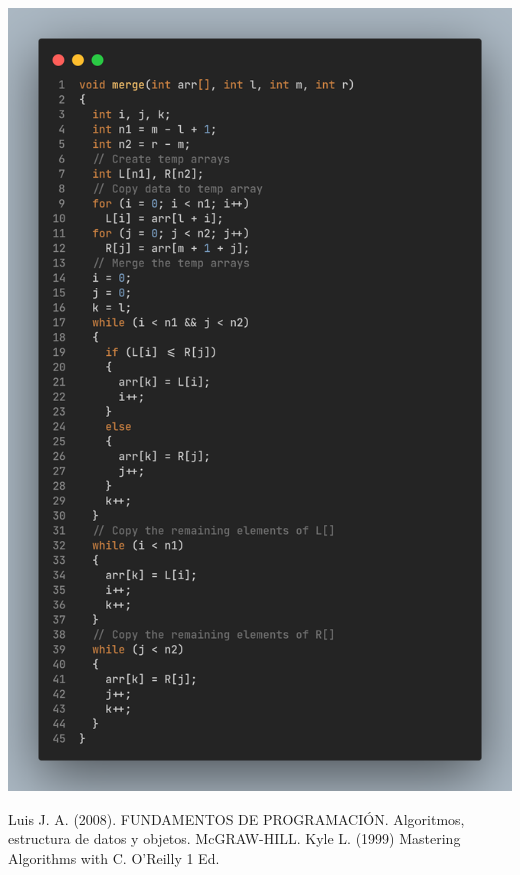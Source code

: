 \documentclass[letterpaper, 12pt]{article}
\begin{document}
  \begin{center}
    \includegraphics[width=.9\textwidth]{src/img/mgsort_2.png}
  \end{center}

  \begin{thebibliography}{0}
     Luis J. A. (2008). FUNDAMENTOS DE PROGRAMACIÓN. Algoritmos, estructura de datos
    y objetos. McGRAW-HILL.
     Kyle L. (1999) Mastering Algorithms with C. O'Reilly 1 Ed.
  \end{thebibliography}
\end{document}
